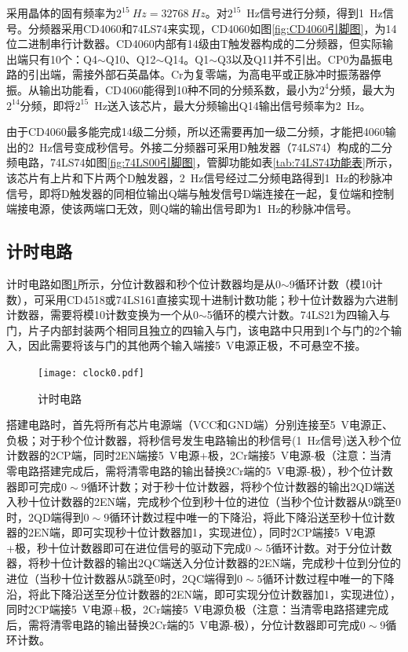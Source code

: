 \documentclass{article}
\newcounter{sub}
\begin{document}
采用晶体的固有频率为$ 2^{15}\SI{}{Hz}= \SI{32768}{Hz} $。对$ 2^{15} $\SI{}{Hz}信号进行分频，得到\SI{1}{Hz}信号。分频器采用CD4060和74LS74来实现，CD4060如图\ref{fig:CD4060引脚图}，为14位二进制串行计数器。CD4060内部有14级由T触发器构成的二分频器，但实际输出端只有10个：Q4$ \sim $Q10、Q12$ \sim $Q14。Q1$ \sim $Q3以及Q11并不引出。CP0为晶振电路的引出端，需接外部石英晶体。Cr为复零端，为高电平或正脉冲时振荡器停振。从输出功能看，CD4060能得到10种不同的分频系数，最小为$ 2^4 $分频，最大为$ 2^14 $分频，即将$ 2^15 $\SI{}{Hz}送入该芯片，最大分频输出Q14输出信号频率为\SI{2}{Hz}。

由于CD4060最多能完成14级二分频，所以还需要再加一级二分频，才能把4060输出的\SI{2}{Hz}信号变成秒信号。外接二分频器可采用D触发器（74LS74）构成的二分频电路，74LS74如图\ref{fig:74LS00引脚图}，管脚功能如表\ref{tab:74LS74功能表}所示，该芯片有上片和下片两个D触发器，\SI{2}{Hz}信号经过二分频电路得到\SI{1}{Hz}的秒脉冲信号，即将D触发器的同相位输出Q端与触发信号D端连接在一起，复位端和控制端接电源，使该两端口无效，则Q端的输出信号即为\SI{1}{Hz}的秒脉冲信号。

\subsection{计时电路}%
\label{sub:计时电路}

计时电路如图\ref{fig:计时电路}所示，分位计数器和秒个位计数器均是从0$ \sim $9循环计数（模10计数），可采用CD4518或74LS161直接实现十进制计数功能；秒十位计数器为六进制计数器，需要将模10计数变换为一个从0$ \sim $5循环的模六计数。74LS21为四输入与门，片子内部封装两个相同且独立的四输入与门，该电路中只用到1个与门的2个输入，因此需要将该与门的其他两个输入端接\SI{5}{V}电源正极，不可悬空不接。

\begin{figure}[htpb]
	\centering
	\texttt{[image: clock0.pdf]}
	\caption{计时电路}
	\label{fig:计时电路}
\end{figure}

搭建电路时，首先将所有芯片电源端（VCC和GND端）分别连接至\SI{5}{V}电源正、负极；对于秒个位计数器，将秒信号发生电路输出的秒信号(\SI{1}{Hz}信号)送入秒个位计数器的2CP端，同时2EN端接\SI{5}{V}电源+极，2Cr端接\SI{5}{V}电源-极（注意：当清零电路搭建完成后，需将清零电路的输出替换2Cr端的\SI{5}{V}电源-极），秒个位计数器即可完成$ 0\sim 9 $循环计数；对于秒十位计数器，将秒个位计数器的输出2QD端送入秒十位计数器的2EN端，完成秒个位到秒十位的进位（当秒个位计数器从9跳至0时，2QD端得到$ 0\sim 9 $循环计数过程中唯一的下降沿，将此下降沿送至秒十位计数器的2EN端，即可实现秒十位计数器加1，实现进位），同时2CP端接\SI{5}{V}电源+极，秒十位计数器即可在进位信号的驱动下完成$ 0\sim 5 $循环计数。对于分位计数器，将秒十位计数器的输出2QC端送入分位计数器的2EN端，完成秒十位到分位的进位（当秒十位计数器从5跳至0时，2QC端得到$ 0\sim 5 $循环计数过程中唯一的下降沿，将此下降沿送至分位计数器的2EN端，即可实现分位计数器加1，实现进位），同时2CP端接\SI{5}{V}电源+极，2Cr端接\SI{5}{V}电源负极（注意：当清零电路搭建完成后，需将清零电路的输出替换2Cr端的\SI{5}{V}电源-极），分位计数器即可完成$ 0\sim 9 $循环计数。
\end{document}
